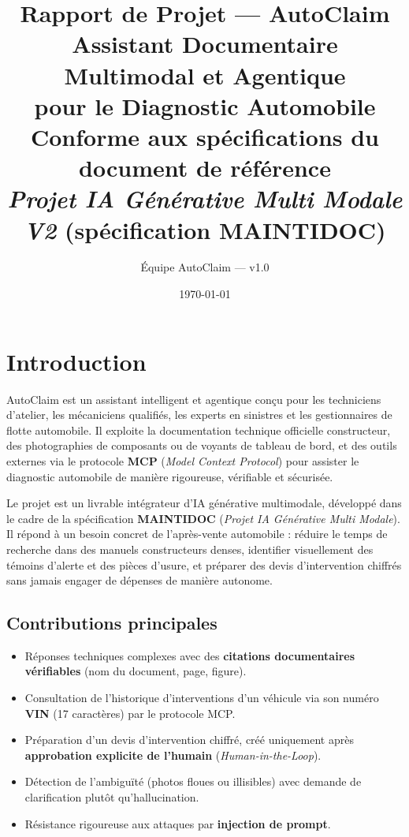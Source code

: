 \documentclass[11pt,a4paper]{article}
\title{
  \textbf{Rapport de Projet — AutoClaim}\\[0.6cm]
  \large Assistant Documentaire Multimodal et Agentique\\
  pour le Diagnostic Automobile\\[0.4cm]
  \normalsize Conforme aux spécifications du document de référence \\
  \emph{Projet IA Générative Multi Modale V2} (spécification MAINTIDOC)
}
\author{\'Equipe AutoClaim — v1.0}
\date{\today}
\begin{document}
\maketitle
\thispagestyle{fancy}

\tableofcontents
\newpage

\section{Introduction}

AutoClaim est un assistant intelligent et agentique conçu pour les techniciens d'atelier, les mécaniciens qualifiés, les experts en sinistres et les gestionnaires de flotte automobile. Il exploite la documentation technique officielle constructeur, des photographies de composants ou de voyants de tableau de bord, et des outils externes via le protocole \textbf{MCP} (\textit{Model Context Protocol}) pour assister le diagnostic automobile de manière rigoureuse, vérifiable et sécurisée.

Le projet est un livrable intégrateur d'IA générative multimodale, développé dans le cadre de la spécification \textbf{MAINTIDOC} (\textit{Projet IA Générative Multi Modale}). Il répond à un besoin concret de l'après-vente automobile : réduire le temps de recherche dans des manuels constructeurs denses, identifier visuellement des témoins d'alerte et des pièces d'usure, et préparer des devis d'intervention chiffrés sans jamais engager de dépenses de manière autonome.

\subsection{Contributions principales}
\begin{itemize}[leftmargin=*]
  \item Réponses techniques complexes avec des \textbf{citations documentaires vérifiables} (nom du document, page, figure).
  \item Consultation de l'historique d'interventions d'un véhicule via son numéro \textbf{VIN} (17 caractères) par le protocole MCP.
  \item Préparation d'un devis d'intervention chiffré, créé uniquement après \textbf{approbation explicite de l'humain} (\textit{Human-in-the-Loop}).
  \item Détection de l'ambiguïté (photos floues ou illisibles) avec demande de clarification plutôt qu'hallucination.
  \item Résistance rigoureuse aux attaques par \textbf{injection de prompt}.
\end{itemize}
\end{document}
